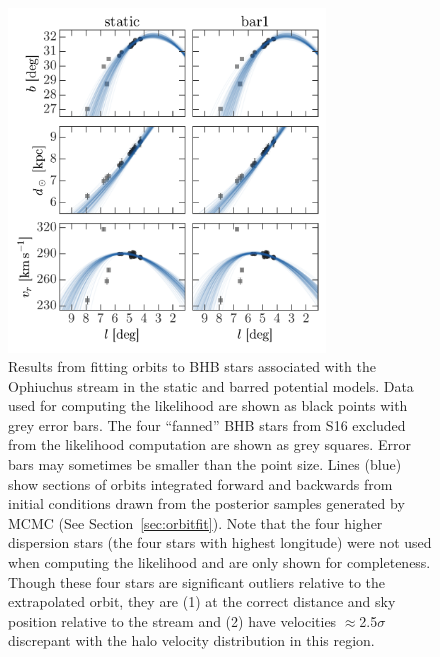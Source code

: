 \begin{figure}[!tbp]
\begin{center}
\includegraphics[width=0.75\textwidth]{figures/ch4/orbitfits}
\caption{ Results from fitting orbits to BHB stars associated with the Ophiuchus
stream in the static and barred potential models. Data used for computing the
likelihood are shown as black points with grey error bars. The four ``fanned''
BHB stars from S16 excluded from the likelihood computation are shown as grey
squares. Error bars may sometimes be smaller than the point size. Lines (blue)
show sections of orbits integrated forward and backwards from initial conditions
drawn from the posterior samples generated by MCMC (See
Section~\ref{sec:orbitfit}). Note that the four higher dispersion stars (the
four stars with highest longitude) were not used when computing the likelihood
and are only shown for completeness. Though these four stars are significant
outliers relative to the extrapolated orbit, they are (1) at the correct
distance and sky position relative to the stream and (2) have velocities
$\approx$2.5$\sigma$ discrepant with the halo velocity distribution in this
region.}
\label{fig:orbitfits}
\end{center}
\end{figure}

